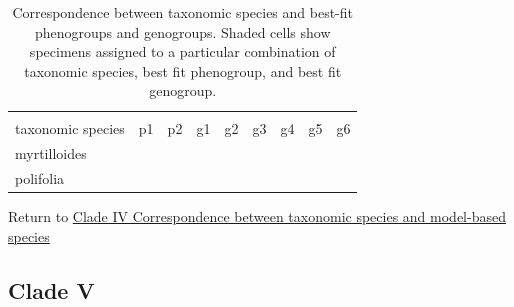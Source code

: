 \documentclass[
  11pt,
]{article}
\begin{document}
\begin{table}[H]

\caption{\label{tab:cladeIVfinalSummary}Correspondence between taxonomic species and best-fit phenogroups and genogroups. Shaded cells show specimens assigned to a particular combination of taxonomic species, best fit phenogroup, and best fit genogroup.}
\centering
\fontsize{8}{10}\selectfont
\begin{tabular}[t]{>{\raggedright\arraybackslash}p{15mm}|>{\centering\arraybackslash}p{5mm}|>{\centering\arraybackslash}p{5mm}||>{\centering\arraybackslash}p{5mm}|>{\centering\arraybackslash}p{5mm}|>{\centering\arraybackslash}p{5mm}|>{\centering\arraybackslash}p{5mm}|>{\centering\arraybackslash}p{5mm}|>{\centering\arraybackslash}p{5mm}|}
\toprule
\multicolumn{1}{c}{} & \multicolumn{2}{c}{Phenogroups} & \multicolumn{6}{c}{Genogroups} \\
\cmidrule(l{3pt}r{3pt}){2-3} \cmidrule(l{3pt}r{3pt}){4-9}
taxonomic species & p1 & p2 & g1 & g2 & g3 & g4 & g5 & g6\\
\midrule
myrtilloides & \cellcolor[HTML]{FFFFFF}{\textcolor[HTML]{FFFFFF}{0}} & \cellcolor[HTML]{BBBBBB}{\textcolor[HTML]{BBBBBB}{1}} & \cellcolor[HTML]{BBBBBB}{\textcolor[HTML]{BBBBBB}{1}} & \cellcolor[HTML]{BBBBBB}{\textcolor[HTML]{BBBBBB}{1}} & \cellcolor[HTML]{FFFFFF}{\textcolor[HTML]{FFFFFF}{0}} & \cellcolor[HTML]{BBBBBB}{\textcolor[HTML]{BBBBBB}{1}} & \cellcolor[HTML]{BBBBBB}{\textcolor[HTML]{BBBBBB}{1}} & \cellcolor[HTML]{BBBBBB}{\textcolor[HTML]{BBBBBB}{1}}\\
\midrule
polifolia & \cellcolor[HTML]{BBBBBB}{\textcolor[HTML]{BBBBBB}{1}} & \cellcolor[HTML]{FFFFFF}{\textcolor[HTML]{FFFFFF}{0}} & \cellcolor[HTML]{FFFFFF}{\textcolor[HTML]{FFFFFF}{0}} & \cellcolor[HTML]{FFFFFF}{\textcolor[HTML]{FFFFFF}{0}} & \cellcolor[HTML]{BBBBBB}{\textcolor[HTML]{BBBBBB}{1}} & \cellcolor[HTML]{FFFFFF}{\textcolor[HTML]{FFFFFF}{0}} & \cellcolor[HTML]{FFFFFF}{\textcolor[HTML]{FFFFFF}{0}} & \cellcolor[HTML]{FFFFFF}{\textcolor[HTML]{FFFFFF}{0}}\\
\bottomrule
\end{tabular}
\end{table}

Return to \protect\hyperlink{correspondence-between-taxonomic-species-and-model-based-species-3}{Clade IV Correspondence between taxonomic species and model-based species}
\pagebreak

\hypertarget{clade-v-1}{%
\subsection{Clade V}\label{clade-v-1}}
\end{document}
